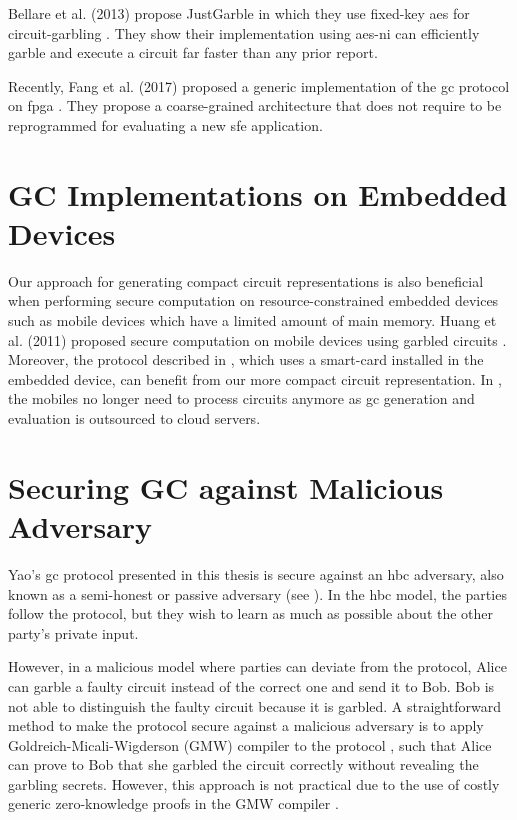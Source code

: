 Bellare et al. (2013) propose JustGarble in which they use fixed-key \acrshort{aes} for circuit-garbling \cite{bellare2013efficient}.
They show their implementation using \acrshort{aes-ni} can efficiently garble and execute a circuit far faster than any prior report.

Recently, Fang et al. (2017) proposed a generic implementation of the \acrshort{gc} protocol on \acrshort{fpga} \cite{fang2017secure}.
They propose a coarse-grained architecture that does not require to be reprogrammed for evaluating a new \acrshort{sfe} application.

\section{GC Implementations on Embedded Devices} \label{sec:related-embedded}
Our approach for generating compact circuit representations is also beneficial when performing secure computation on resource-constrained embedded devices such as mobile devices which have a limited amount of main memory.
Huang et al. (2011) proposed secure computation on mobile devices using garbled circuits \cite{huang2011privacy}.
Moreover, the protocol described in \cite{demmler2014ad}, which uses a smart-card installed in the embedded device, can benefit from our more compact circuit representation.
In \cite{carter2016secure, carter2014whitewash}, the mobiles no longer need to process circuits anymore as \acrshort{gc} generation and evaluation is outsourced to cloud servers.

\section{Securing GC against Malicious Adversary}\label{sec:related-malicious}
Yao's \acrshort{gc} protocol presented in this thesis is secure against an \acrfull{hbc} adversary, also known as a semi-honest or passive adversary (see ).
In the \acrshort{hbc} model, the parties follow the protocol, but they wish to learn as much as possible about the other party's private input.

However, in a malicious model where parties can deviate from the protocol, Alice can garble a faulty circuit instead of the correct one and send it to Bob.
Bob is not able to distinguish the faulty circuit because it is garbled.
A straightforward method to make the protocol secure against a malicious adversary is to apply Goldreich-Micali-Wigderson (GMW) compiler to the protocol \cite{goldreich1987play}, such that Alice can prove to Bob that she garbled the circuit correctly without revealing the garbling secrets.
However, this approach is not practical due to the use of costly generic zero-knowledge proofs in the GMW compiler \cite{lindell2007efficient}.

